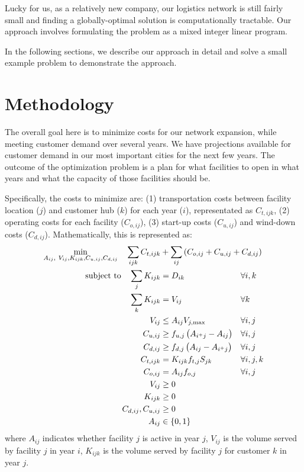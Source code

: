 \documentclass[hidelinks,twoside,10pt,letterpaper]{../note}
\begin{document}
Lucky for us, as a relatively new company, our logistics network is still fairly small and finding a globally-optimal solution is computationally tractable.
Our approach involves formulating the problem as a mixed integer linear program.

In the following sections, we describe our approach in detail and solve a small example problem to demonstrate the approach.

\section{Methodology}

The overall goal here is to minimize costs for our network expansion, while meeting customer demand over several years.
We have projections available for customer demand in our most important cities for the next few years.
The outcome of the optimization problem is a plan for what facilities to open in what years and what the capacity of those facilities should be.

Specifically, the costs to minimize are: (1) transportation costs between facility location ($j$) and customer hub ($k$) for each year ($i$), representated as $C_{t,ijk}$, (2) operating costs for each facility ($C_{o,ij}$), (3) start-up costs ($C_{u,ij}$) and wind-down costs ($C_{d,ij}$).
Mathematically, this is represented as:
\begin{subequations}\label{eq:flp_optimization}
\begin{align}
    \min_{A_{ij}, \ V_{ij}, K_{ijk}, C_{u,ij}, C_{d,ij}} \quad \sum_{ijk} C_{t,ijk} & + \sum_{ij} \left(C_{o,ij}  + C_{u,ij} + C_{d,ij}\right)  \hspace{-3in}&&  \\
    \textrm{subject to} \quad  \sum_j K_{ijk} &= D_{ik} \quad && \forall i,k \label{eq:opt:customer-demand}\\
    \sum_k K_{ijk} &= V_{ij} && \forall k \label{eq:opt:network-demand}\\
    V_{ij} &\leq A_{ij} V_{j,\max} && \forall i,j \label{eq:opt:max-capacity}\\
    C_{u,ij} &\geq f_{u,j} \left (A_{i^+j} - A_{ij}\right )  && \forall i,j \label{eq:opt:start-up}\\
    C_{d,ij} &\geq f_{d,j} \left (A_{ij} - A_{i^+j}\right )  && \forall i,j \label{eq:opt:wind-down}\\
    C_{t,ijk} &= K_{ijk} f_{t,j} S_{jk} \quad && \forall i,j,k  \label{eq:opt:transportation_cost}\\
    C_{o,ij} &= A_{ij} f_{o,j} \quad && \forall i,j \label{eq:opt:operating-cost}\\
    V_{ij} &\geq 0 \\
    K_{ijk} &\geq 0 \\
    C_{d,ij}, C_{u,ij} &\geq 0 \\
    A_{ij} &\in \left\{0,1\right\}
  \end{align}
\end{subequations}
where $A_{ij}$ indicates whether facility $j$ is active in year $j$, $V_{ij}$ is the volume served by facility $j$ in year $i$, $K_{ijk}$ is the volume served by facility $j$ for customer $k$ in year $j$.
\end{document}
